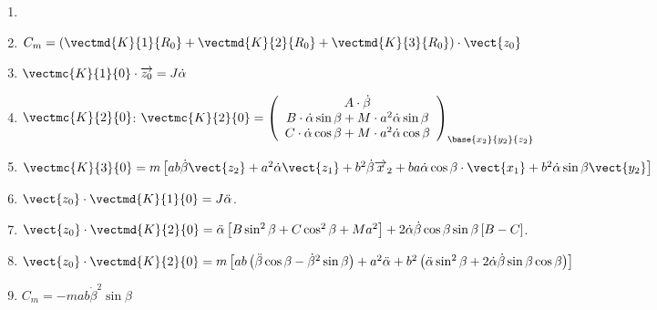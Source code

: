 \begin{solution}
\begin{enumerate}
\item 
\item $C_m=\left(\vectmd{K}{1}{R_0}+\vectmd{K}{2}{R_0}+\vectmd{K}{3}{R_0}\right)\cdot \vect{z_0}$
\item  $ \vectmc{K}{1}{0}\cdot\overrightarrow{z_0} = J \dot{\alpha}$
\item  $\vectmc{K}{2}{0}$: $
\vectmc{K}{2}{0}=\left(
\begin{array}{c}
A\cdot \dot{\beta}\\
B\cdot \dot{\alpha} \sin\beta+M\cdot a^2 \dot{\alpha}\sin\beta\\
C\cdot \dot{\alpha} \cos\beta+M\cdot a^2 \dot{\alpha}\cos\beta\\
\end{array}
\right)_{\base{{x}_2}{{y}_2}{{z}_2}}\\
$
\item $
\vectmc{K}{3}{0}=m\left[a b\dot{\beta} \vect{z_2}+a^2 \dot{\alpha}\vect{z_{1}}+b^2 \dot{\beta}\overrightarrow{x}_2+b a \dot{\alpha} \cos\beta\cdot \vect{x_{1}}+b^2 \dot{\alpha}\sin\beta \vect{y_{2}}\right]
$
\item $\vect{z_0}\cdot \vectmd{K}{1}{0}=J \ddot{\alpha}$.
\item $\vect{z_0}\cdot \vectmd{K}{2}{0}=\ddot{\alpha}\left[B\sin^2\beta+C\cos^2\beta+Ma^2\right]
+2\dot{\alpha}\dot{\beta} \cos\beta \sin\beta\left[B-C\right]$.

\item $\vect{z_0}\cdot \vectmd{K}{2}{0}=m\left[a b\left(\ddot{\beta}\cos\beta-\dot{\beta}^2\sin\beta\right)+a^2\ddot{\alpha}+b^2\left(\ddot{\alpha}\sin^2\beta+2\dot{\alpha}\dot{\beta}\sin\beta\cos\beta\right)\right]$
\item $
C_m=-mab\dot{\beta}^2\sin\beta
$
\end{enumerate}
\end{solution}%

\fi
\fi
